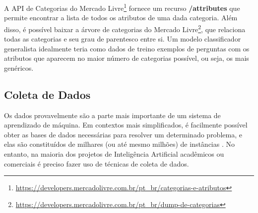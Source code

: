 A API de Categorias do Mercado Livre\footnote{\url{https://developers.mercadolivre.com.br/pt_br/categorias-e-atributos}} fornece um recurso \textbf{/attributes} que permite encontrar a lista de todos os atributos de uma dada categoria. Além disso, é possível baixar a árvore de categorias do Mercado Livre\footnote{\url{https://developers.mercadolivre.com.br/pt_br/dump-de-categorias}}, que relaciona todas as categorias e seu grau de parentesco entre si. Um modelo classificador generalista idealmente teria como dados de treino exemplos de perguntas com os atributos que aparecem no maior número de categorias possível, ou seja, os mais genéricos.

\subsection{Coleta de Dados}
\label{coleta de dados}
Os dados provavelmente são a parte mais importante de um sistema de aprendizado de máquina. Em contextos mais simplificados, é facilmente possível obter as bases de dados necessárias para resolver um determinado problema, e elas são constituídos de milhares (ou até mesmo milhões) de instâncias \cite{practical_nlp}. No entanto, na maioria dos projetos de Inteligência Artificial acadêmicos ou comerciais é preciso fazer uso de técnicas de coleta de dados.

